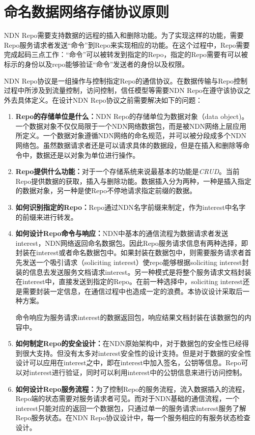 \section{命名数据网络存储协议原则}
NDN Repo需要支持数据的远程的插入和删除功能。为了实现这样的功能，需要Repo服务请求者发送“命令”到Repo来实现相应的功能。在这个过程中，Repo需要完成起码三点工作：“命令”可以被转发到指定的Repo，指定的Repo需要有可以被标示的身份以及repo能够验证“命令”发送者的身份以及权限。

NDN Repo协议是一组操作与控制指定Repo的通信协议。在数据传输与Repo控制过程中所涉及到流量控制，访问控制，信任模型等需要NDN Repo在遵守该协议之外去具体定义。在设计NDN Repo协议之前需要解决如下的问题：
\begin{enumerate}
\item \textbf{Repo的存储单位是什么：}NDN Repo的存储单位为数据对象（data object)。一个数据对象不仅仅局限于一个NDN网络数据包，而是被NDN网络上层应用所定义。一个数据对象遵循NDN网络的命名规范，并可以被分段成多个NDN网络包。虽然数据请求者还是可以请求具体的数据段，但是在插入和删除等命令中，数据还是以对象为单位进行操作。
\item \textbf{Repo提供什么功能：}对于一个存储系统来说最基本的功能是\textit{CRUD}。当前Repo提供数据的获取，插入与删除功能。数据插入分为两种，一种是插入指定的数据对象，另一种是使Repo不停地请求指定前缀的数据。
\item \textbf{如何识别指定的Repo：}Repo通过NDN名字前缀来制定，作为interest中名字的前缀来进行转发。
\item \textbf{如何设计Repo命令与响应：}NDN中基本的通信流程为数据请求者发送interest，NDN网络返回命名数据包。因此Repo服务请求信息有两种选择，即封装在interest或者命名数据包中。如果封装在数据包中，则需要服务请求者首先发送一个吸引请求（soliciting interest）使repo能够根据soliciting interest封装的信息去发送服务文档请求interest。另一种模式是将整个服务请求文档封装在interest中，直接发送到指定的Repo。在前一种选择中，soliciting interest还是需要封装一定信息，在通信过程中也造成一定的浪费。本协议设计采取后一种方案。

命令响应为服务请求interest的数据返回包，响应结果文档封装在该数据包的内容中。
\item \textbf{如何制定Repo的安全设计：}在NDN原始架构中，对于数据包的安全性已经得到很大支持。但没有太多对interest安全性的设计支持。但是对于数据的安全性设计可以应用在interest之中，即在interest中加入签名，公钥等信息。Repo可以对interest进行验证，同时可以利用interest中的公钥信息来进行访问控制。
\item \textbf{如何设计Repo服务流程：}为了控制Repo的服务流程，流入数据插入的流程，Repo端的状态需要对服务请求者可见。而对于NDN基础的通信流程，一个interest只能对应的返回一个数据包，只通过单一的服务请求interest服务了解Repo服务状态。在NDN Repo协议设计中，每一个服务相应的有服务状态检查设计。
\end{enumerate}

